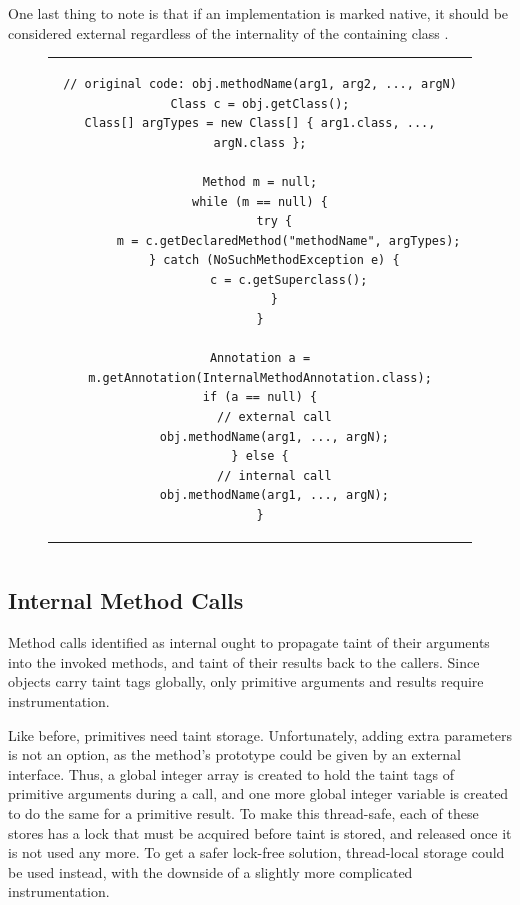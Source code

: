 \documentclass[12pt,twoside,notitlepage]{report}
\begin{document}
One last thing to note is that if an implementation is marked native, it should be considered external regardless of the internality of the containing class
.
\begin{figure}[h]
	\centering
	\begin{tabular}{c}
	\begin{lstlisting}
// original code: obj.methodName(arg1, arg2, ..., argN)
Class c = obj.getClass();
Class[] argTypes = new Class[] { arg1.class, ..., argN.class };

Method m = null;
while (m == null) {
	try {
 		m = c.getDeclaredMethod("methodName", argTypes);
 	} catch (NoSuchMethodException e) {
 		c = c.getSuperclass();
 	}
}

Annotation a = m.getAnnotation(InternalMethodAnnotation.class);
if (a == null) {
	// external call
	obj.methodName(arg1, ..., argN);
} else {
	// internal call
	obj.methodName(arg1, ..., argN);
}
	\end{lstlisting}
	\end{tabular}
	\begin{lstlisting}[caption={Destination-deciding instrumentation for non-public methods},
	                   label={listing:TaintPropagation_MethodCall_DestDecidability_NonPublic}]
	\end{lstlisting}
\end{figure}

\subsection{Internal Method Calls}
\label{section:TaintPropagation_MethodCalls_Internal}

Method calls identified as internal ought to propagate taint of their arguments into the invoked methods, and taint of their results back to the callers. Since objects carry taint tags globally, only primitive arguments and results require instrumentation. 

Like before, primitives need taint storage. Unfortunately, adding extra parameters is not an option, as the method's prototype could be given by an external interface. Thus, a global integer array is created to hold the taint tags of primitive arguments during a call, and one more global integer variable is created to do the same for a primitive result. To make this thread-safe, each of these stores has a lock that must be acquired before taint is stored, and released once it is not used any more. To get a safer lock-free solution, thread-local storage could be used instead, with the downside of a slightly more complicated instrumentation.
\end{document}
